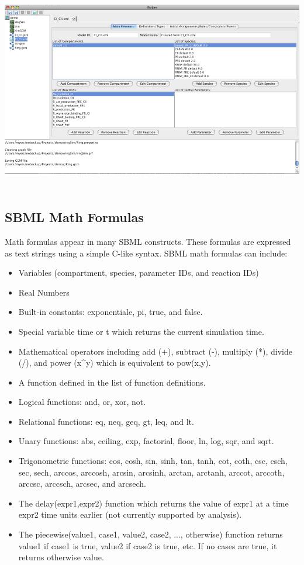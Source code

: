 \documentclass[titlepage,11pt]{article}
\begin{document}
\begin{center}
\includegraphics[height=90mm]{screenshots/SBMLedit}
\end{center}

\clearpage

\subsection{\label{SBMLMath}SBML Math Formulas}

\noindent
Math formulas appear in many SBML constructs.  These formulas are 
expressed as text strings using a simple C-like syntax. 
SBML math formulas can include: 
\begin{itemize}
\item Variables (compartment, species, parameter IDs, and reaction IDs)
\item Real Numbers
\item Built-in constants: exponentiale, pi, true, and false.
\item Special variable time or t which returns the current simulation time.
\item Mathematical operators including add (+), subtract (-), multiply
  (*), divide (/), and power (x\^{}y) which is equivalent to pow(x,y).
\item A function defined in the list of function definitions.
\item Logical functions: and, or, xor, not.
\item Relational functions: eq, neq, geq, gt, leq, and lt.
\item Unary functions: abs, ceiling, exp, factorial, floor, ln, log,
  sqr, and sqrt.
\item Trigonometric functions: cos, cosh, sin, sinh, tan, tanh, cot,
  coth, csc, csch, sec, sech, arccos, arccosh, arcsin, arcsinh,
  arctan, arctanh, arccot, arccoth, arccsc, arccsch, arcsec, and arcsech.
\item The delay(expr1,expr2) function which returns the value of expr1 at a time
      expr2 time units earlier (not currently supported by analysis).
\item The piecewise(value1, case1, value2, case2, ..., otherwise)
  function returns value1 if case1 is true, value2 if case2 is true,
  etc.  If no cases are true, it returns otherwise value.
\end{itemize}
\end{document}
